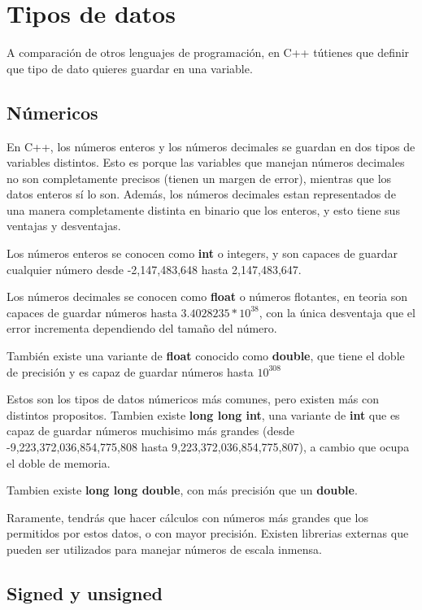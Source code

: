 \documentclass{article}
\begin{document}
\section{Tipos de datos}

A comparación de otros lenguajes de programación, en C++ tútienes que definir que tipo de dato quieres guardar en una variable.

\subsection{Númericos}

En C++, los números enteros y los números decimales se guardan en dos tipos de variables distintos. Esto es porque las variables que manejan números decimales no son completamente precisos (tienen un margen de error), mientras que los datos enteros sí lo son. Además, los números decimales estan representados de una manera completamente distinta en binario que los enteros, y esto tiene sus ventajas y desventajas.

Los números enteros se conocen como \textbf{int} o integers, y son capaces de guardar cualquier número desde -2,147,483,648 hasta 2,147,483,647.

Los números decimales se conocen como \textbf{float} o números flotantes, en teoria son capaces de guardar números hasta $3.4028235*10^{38}$, con la única desventaja que el error incrementa dependiendo del tamaño del número.

También existe una variante de \textbf{float} conocido como \textbf{double}, que tiene el doble de precisión y es capaz de guardar números hasta $10^{308}$

Estos son los tipos de datos númericos más comunes, pero existen más con distintos propositos. Tambien existe \textbf{long long int}, una variante de \textbf{int} que es capaz de guardar números muchisimo más grandes (desde -9,223,372,036,854,775,808 hasta 9,223,372,036,854,775,807), a cambio que ocupa el doble de memoria.

Tambien existe \textbf{long long double}, con más precisión que un \textbf{double}.

Raramente, tendrás que hacer cálculos con números más grandes que los permitidos por estos datos, o con mayor precisión. Existen librerias externas que pueden ser utilizados para manejar números de escala inmensa.

\subsection{Signed y unsigned}
\end{document}

